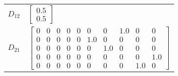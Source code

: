 \begin{tabular}{cl}
 $D_{12}$ & $\left[\begin{matrix}0.5\\0.5\end{matrix}\right]$                                                                                                                                                                                                                                                                                                                                                                                                                                                                                     \\
 $D_{21}$ & $\left[\begin{matrix}0 & 0 & 0 & 0 & 0 & 0 & 0 & 1.0 & 0 & 0\\0 & 0 & 0 & 0 & 0 & 1.0 & 0 & 0 & 0 & 0\\0 & 0 & 0 & 0 & 0 & 0 & 1.0 & 0 & 0 & 0\\0 & 0 & 0 & 0 & 0 & 0 & 0 & 0 & 0 & 1.0\\0 & 0 & 0 & 0 & 0 & 0 & 0 & 0 & 1.0 & 0\end{matrix}\right]$                                                                                                                                                                                                                                                                                  \\
\hline
\end{tabular}